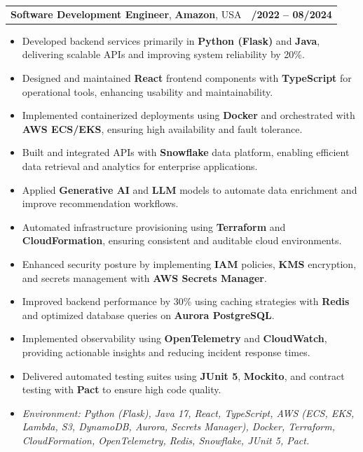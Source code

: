 \documentclass[letterpaper,11pt]{article}
\makeatletter
\newcommand{\resumeItem}[1]{
  \item\footnotesize{
    {#1 \vspace{-2pt}}
  }
}
\newcommand{\resumeSubheading}[4]{
  \vspace{-2pt}\item
    \begin{tabular*}{1.0\textwidth}[t]{l@{\extracolsep{\fill}}r}
      \textbf{\fontsize{10pt}{14pt}\selectfont #3}, \textbf{\fontsize{10pt}{14pt}\selectfont #1}, \fontsize{10pt}{14pt}\selectfont #4 & \textbf{\fontsize{10pt}{14pt}\selectfont #2} \\
    \end{tabular*}\vspace{-7pt}
}
\newcommand{\resumeItemListStart}{\begin{itemize}[leftmargin=*]}
\newcommand{\resumeItemListEnd}{\end{itemize}\vspace{-5pt}}
\makeatother
\begin{document}
\resumeSubheading
{Amazon}{10/2022 -- 08/2024}
{Software Development Engineer}{USA}
\resumeItemListStart
  \resumeItem{Developed backend services primarily in \textbf{Python (Flask)} and \textbf{Java}, delivering scalable APIs and improving system reliability by 20\%.}
  \resumeItem{Designed and maintained \textbf{React} frontend components with \textbf{TypeScript} for operational tools, enhancing usability and maintainability.}
  \resumeItem{Implemented containerized deployments using \textbf{Docker} and orchestrated with \textbf{AWS ECS/EKS}, ensuring high availability and fault tolerance.}
  \resumeItem{Built and integrated APIs with \textbf{Snowflake} data platform, enabling efficient data retrieval and analytics for enterprise applications.}
  \resumeItem{Applied \textbf{Generative AI} and \textbf{LLM} models to automate data enrichment and improve recommendation workflows.}
  \resumeItem{Automated infrastructure provisioning using \textbf{Terraform} and \textbf{CloudFormation}, ensuring consistent and auditable cloud environments.}
  \resumeItem{Enhanced security posture by implementing \textbf{IAM} policies, \textbf{KMS} encryption, and secrets management with \textbf{AWS Secrets Manager}.}
  \resumeItem{Improved backend performance by 30\% using caching strategies with \textbf{Redis} and optimized database queries on \textbf{Aurora PostgreSQL}.}
  \resumeItem{Implemented observability using \textbf{OpenTelemetry} and \textbf{CloudWatch}, providing actionable insights and reducing incident response times.}
  \resumeItem{Delivered automated testing suites using \textbf{JUnit 5}, \textbf{Mockito}, and contract testing with \textbf{Pact} to ensure high code quality.}
  \resumeItem{\textit{Environment: Python (Flask), Java 17, React, TypeScript, AWS (ECS, EKS, Lambda, S3, DynamoDB, Aurora, Secrets Manager), Docker, Terraform, CloudFormation, OpenTelemetry, Redis, Snowflake, JUnit 5, Pact.}}
\resumeItemListEnd
\end{document}
